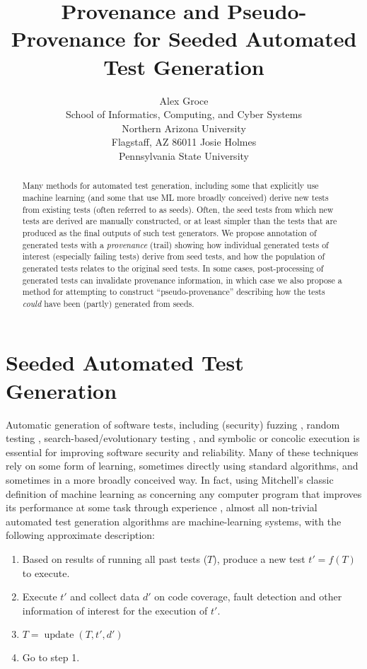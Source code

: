 \documentclass[final]{article}
\title{Provenance and Pseudo-Provenance for Seeded Automated Test Generation}
\author{
Alex Groce\\
School of Informatics, Computing, and Cyber Systems\\
Northern Arizona University\\
Flagstaff, AZ 86011
\And
Josie Holmes\\
Pennsylvania State University 
}
\DeclareMathOperator{\Update}{update}
\begin{document}

\maketitle

\begin{abstract}
  Many methods for automated test generation, including some that
  explicitly use machine learning (and some that use ML more broadly
  conceived) derive new tests from existing tests (often referred to
  as seeds).  Often, the seed tests
  from which new tests are derived are manually constructed, or at least
  simpler than the tests that are produced as the final outputs of
  such test generators.  We
  propose annotation of generated tests with a \emph{provenance} (trail) showing
  how individual generated tests of interest (especially failing tests) derive
  from seed tests, and how the population of generated tests relates
  to the original seed tests.  In some cases, post-processing of
  generated tests can invalidate provenance information, in which case
  we also propose a method for attempting to construct
  ``pseudo-provenance'' describing how the tests \emph{could} have
  been (partly) generated from seeds.
\end{abstract}

\section{Seeded Automated Test Generation}

Automatic generation of software tests, including (security) fuzzing
\cite{aflfuzz,TrailBitsSeeded}, random testing \cite{csmith,ICSEDiff,Pacheco},
search-based/evolutionary testing \cite{FA11},
and symbolic or concolic execution
\cite{Whitebox,GodefroidKS05,KLEE,Person:2011:DIS:1993498.1993558,Marinescu:2012:MTS:2337223.2337308,issta14}
is essential for improving software security and reliability.  Many of
these techniques rely on some form of learning, sometimes directly
using standard algorithms, and sometimes in a more broadly conceived
way.  In fact, using Mitchell's classic definition of machine learning
as concerning any computer program that improves its performance at some
task through experience \cite{Mitchell}, almost all non-trivial automated test generation
algorithms are machine-learning systems, with the following
approximate description:

\begin{enumerate}
\item Based on results of running all past tests ($T$), produce a new test
  $t' = f(T)$ to execute.
\item Execute $t'$ and collect data $d'$ on code coverage, fault detection and other
  information of interest for the execution of $t'$.
\item $T = \Update(T,t',d')$
\item Go to step 1.
\end{enumerate}
\end{document}
